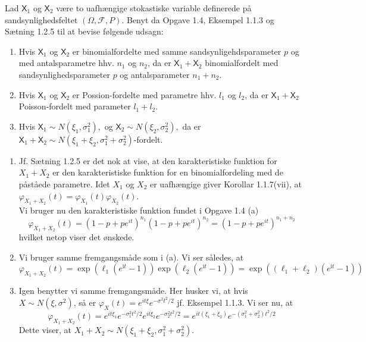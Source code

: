 \documentclass{Class}
\newcommand{\1}{\mathbbm{1}}
\newcommand{\X}{\mathsf{X}}
\newcommand{\pfield}{(\Omega, \mathcal{F}, P)}
\theoremstyle{boxed}
\begin{document}
Lad $\X_1$ og $\X_2$ være to uafhængige stokastiske variable definerede på sandsynlighedsfeltet $\pfield$. Benyt da Opgave 1.4, Eksempel 1.1.3 og Sætning 1.2.5 til at bevise følgende udsagn:
\begin{enumerate}
  \item Hvis $\X_1$ og $\X_2$ er binomialfordelte med samme sandsynligehdsparameter $p$ og med antalsparametre hhv. $n_1$ og $n_2$, da er $\X_1+\X_2$ binomialfordelt med sandsynlighedsparameter $p$ og antalsparameter $n_1+n_2.$
  \item Hvis $\X_1$ og $\X_2$ er Possion-fordelte med parametre hhv. $\mathit{l}_1$ og $\mathit{l}_2$, da er $\X_1+\X_2$ Poisson-fordelt med parameter $\mathit{l}_1+\mathit{l}_2.$
  \item Hvis $\X_1\sim N(\xi_1,\sigma_1^2),$ og $\X_2\sim N(\xi_2,\sigma_2^2),$ da er $\X_1+\X_2\sim N(\xi_1+\xi_2, \sigma_1^2+\sigma_2^2)$-fordelt.
\end{enumerate}
\solution
\begin{enumerate}
  \item Jf. Sætning 1.2.5 er det nok at vise, at den karakteristiske funktion for $X_1+X_2$ er den karakteristiske funktion for en binomialfordeling med de påståede parametre. Idet $X_1$ og $X_2$ er uafhængige giver Korollar 1.1.7(vii), at $\varphi_{X_1+X_2}(t)=\varphi_{X_1}(t) \varphi_{X_2}(t)$. \\Vi bruger nu den karakteristiske funktion fundet i Opgave 1.4 (a)
  $$
  \varphi_{X_1+X_2}(t)=\left(1-p+p e^{i t}\right)^{n_1}\left(1-p+p e^{i t}\right)^{n_2}=\left(1-p+p e^{i t}\right)^{n_1+n_2}
  $$
  hvilket netop viser det ønskede.
  \item Vi bruger samme fremgangsmåde som i (a). Vi ser således, at
    $$\varphi_{X_1+X_2}(t)=\exp \left(\ell_1\left(e^{\mathrm{i} t}-1\right)\right) \exp \left(\ell_2\left(e^{\mathrm{i} t}-1\right)\right)=\exp \left(\left(\ell_1+\ell_2\right)\left(e^{\mathrm{i} t}-1\right)\right)$$
  \item Igen benytter vi samme fremgangsmåde. Her husker vi, at hvis $X \sim N\left(\xi, \sigma^2\right)$, så er $\varphi_X(t)=e^{i t \xi} e^{-\sigma^2 t^2 / 2}$ jf. Eksempel 1.1.3. Vi ser nu, at
  $$
  \varphi_{X_1+X_2}(t)=e^{i t \xi_1} e^{-\sigma_1^2 t^2 / 2} e^{i t \xi_2} e^{-\sigma_2^2 t^2 / 2}=e^{i t\left(\xi_1+\xi_2\right)} e^{-\left(\sigma_1^2+\sigma_2^2\right) t^2 / 2}
  $$
  Dette viser, at $X_1+X_2 \sim N\left(\xi_1+\xi_2, \sigma_1^2+\sigma_2^2\right)$.
\end{enumerate}
\end{document}
